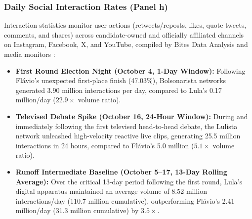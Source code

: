 \subsubsection*{Daily Social Interaction Rates (Panel h)}
Interaction statistics monitor user actions (retweets/reposts, likes, quote tweets, comments, and shares) across candidate-owned and officially affiliated channels on Instagram, Facebook, X, and YouTube, compiled by Bites Data Analysis and media monitors \citep{bites2026digital}:
\begin{itemize}
    \item \textbf{First Round Election Night (October 4, 1-Day Window):} Following Fl{\'a}vio's unexpected first-place finish (47.03\%), Bolsonarista networks generated 3.90 million interactions per day, compared to Lula's 0.17 million/day ($22.9\times$ volume ratio).
    \item \textbf{Televised Debate Spike (October 16, 24-Hour Window):} During and immediately following the first televised head-to-head debate, the Lulista network unleashed high-velocity reactive live clips, generating 25.5 million interactions in 24 hours, compared to Fl{\'a}vio's 5.0 million ($5.1\times$ volume ratio).
    \item \textbf{Runoff Intermediate Baseline (October 5--17, 13-Day Rolling Average):} Over the critical 13-day period following the first round, Lula's digital apparatus maintained an average volume of 8.52 million interactions/day (110.7 million cumulative), outperforming Fl{\'a}vio's 2.41 million/day (31.3 million cumulative) by $3.5\times$.
\end{itemize}

